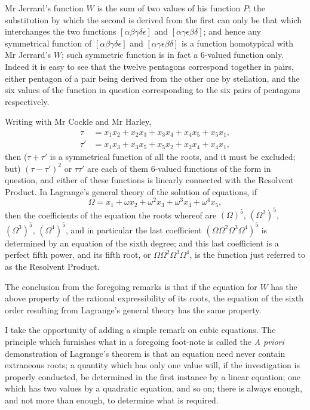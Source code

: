 \documentclass[11pt,a4paper]{article}
\theoremstyle{plain}
\begin{document}
Mr Jerrard's function $W$ is the sum of two values of his function $P$; the substitution by which the second is derived from the first can only be that which interchanges the two functions $[\alpha\beta\gamma\delta\epsilon]$ and $[\alpha\gamma\epsilon\beta\delta]$; and hence any symmetrical function of $[\alpha\beta\gamma\delta\epsilon]$ and $[\alpha\gamma\epsilon\beta\delta]$ is a function homotypical with Mr Jerrard's $W$; such symmetric function is in fact a 6-valued function only. Indeed it is easy to see that the twelve pentagons correspond together in pairs, either pentagon of a pair being derived from the other one by stellation, and the six values of the function in question corresponding to the six pairs of pentagons respectively.

Writing with Mr Cockle and Mr Harley,
\begin{align*}
\tau &= x_1x_2 + x_2x_3 + x_3x_4 + x_4x_5 + x_5x_1, \\
\tau' &= x_1x_3 + x_3x_5 + x_5x_2 + x_2x_4 + x_4x_1,
\end{align*}
then ($\tau + \tau'$ is a symmetrical function of all the roots, and it must be excluded; but) $(\tau - \tau')^2$ or $\tau\tau'$ are each of them 6-valued functions of the form in question, and either of these functions is linearly connected with the Resolvent Product. In Lagrange's general theory of the solution of equations, if
\[
\Omega = x_1 + \omega x_2 + \omega^2 x_3 + \omega^3 x_4 + \omega^4 x_5,
\]
then the coefficients of the equation the roots whereof are $(\Omega)^5$, $(\Omega^2)^5$, $(\Omega^3)^5$, $(\Omega^4)^5$, and in particular the last coefficient $(\Omega\Omega^2\Omega^3\Omega^4)^5$ is determined by an equation of the sixth degree; and this last coefficient is a perfect fifth power, and its fifth root, or $\Omega\Omega^2\Omega^3\Omega^4$, is the function just referred to as the Resolvent Product.

The conclusion from the foregoing remarks is that if the equation for $W$ has the above property of the rational expressibility of its roots, the equation of the sixth order resulting from Lagrange's general theory has the same property.

I take the opportunity of adding a simple remark on cubic equations. The principle which furnishes what in a foregoing foot-note is called the \textit{A priori} demonstration of Lagrange's theorem is that an equation need never contain extraneous roots; a quantity which has only one value will, if the investigation is properly conducted, be determined in the first instance by a linear equation; one which has two values by a quadratic equation, and so on; there is always enough, and not more than enough, to determine what is required.
\end{document}
